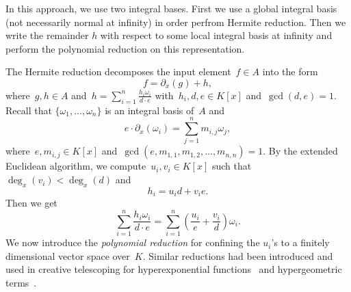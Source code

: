 \documentclass{sig-alternate}
\begin{document}
In this approach, we use two integral bases. First we use a global integral basis (not
necessarily normal at infinity) in order perfrom Hermite reduction. Then we write the
remainder $h$ with respect to some local integral basis at infinity and perform the
polynomial reduction on this representation.

The Hermite reduction decomposes the input element~$f\in A$ into the form
\[f = \partial_x(g) + h,\]
where~$g, h\in A$ and~$h = \sum_{i=1}^n \frac{h_i \omega_i}{d\cdot e}$ with~$h_i, d, e\in K[x]$ and~$\gcd(d, e)=1$.
Recall that $\{\omega_1, \ldots, \omega_n\}$ is an integral basis of~$A$ and
\[e \cdot  \partial_x(\omega_i) = \sum_{j=1}^n m_{i, j}\omega_j,\]
where~$e, m_{i, j}\in K[x]$ and~$\gcd(e, m_{1, 1}, m_{1, 2}, \ldots, m_{n, n})=1$.
By the extended Euclidean algorithm, we compute~$u_i, v_i\in K[x]$ such that
$\deg_x(v_i) < \deg_x(d)$ and
\[h_i = u_i d + v_i e.\]
Then we get
\[ \sum_{i=1}^n \frac{h_i\omega_i}{d \cdot e} =  \sum_{i=1}^n \left(\frac{u_i}{e} + \frac{v_i}{d}\right)\omega_i.\]
We now introduce the \emph{polynomial reduction} for confining the $u_i$'s to a finitely
dimensional vector space over~$K$. Similar reductions had been introduced and used in creative telescoping
for hyperexponential functions~\cite{bostan13a} and hypergeometric terms~\cite{chen15a}.
\end{document}
